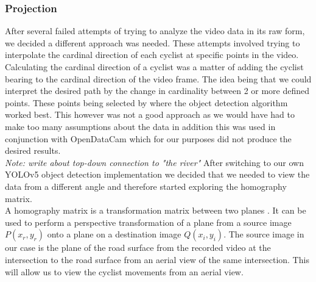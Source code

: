 \color{red}
\subsubsection{Projection}
After several failed attempts of trying to analyze the video data in its raw form, we decided a different approach was needed.
These attempts involved trying to interpolate the cardinal direction of each cyclist at specific points in the video. Calculating the cardinal direction
of a cyclist was a matter of adding the cyclist bearing to the cardinal direction of the video frame. The idea being that we could interpret
the desired path by the change in cardinality between 2 or more defined points. These points being selected by where the object detection algorithm worked best.
This however was not a good approach as we would have had to make too many assumptions about the data in addition this was used in conjunction
with OpenDataCam which for our purposes did not produce the desired results.
\color{black}
\ \\

\textit{Note: write about top-down connection to "the river"}
After switching to our own YOLOv5 object detection implementation we decided that we needed to view the data from a different angle and therefore
started exploring the homography matrix.
\ \\
A homography matrix is a transformation matrix between two planes \cite{hartley_zisserman_2004}. It can be used to perform a perspective transformation of a plane from a source image $P(x_r, y_r)$ onto a plane on a destination image $Q(x_i, y_i)$.
The source image in our case is the plane of the road surface from the recorded video at the intersection to the road surface from an aerial view of the same intersection. 
This will allow us to view the cyclist movements from an aerial view.

